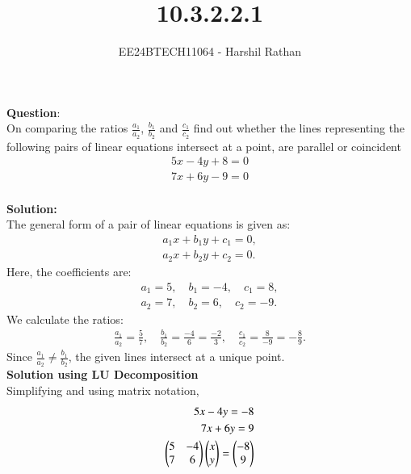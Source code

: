 \documentclass[journal]{IEEEtran}
\begin{document}

\vspace{3cm}

\title{10.3.2.2.1}
\author{EE24BTECH11064 - Harshil Rathan}
 \maketitle
{\let\newpage\relax\maketitle}

\renewcommand{\thefigure}{\theenumi}
\renewcommand{\thetable}{\theenumi}
\setlength{\intextsep}{10pt} %


\renewcommand{\thetable}{\theenumi}
\textbf{Question}:\\
On comparing the ratios $\frac{a_1}{a_2}$, $\frac{b_1}{b_2}$ and $\frac{c_1}{c_2}$ find out whether the lines representing the following pairs of linear equations intersect at a point, are parallel or coincident
\begin{align*}
    5x-4y+8 = 0 \\ 7x+6y-9 = 0 
\end{align*}
\\
\textbf{Solution: }\\
The general form of a pair of linear equations is given as:
\begin{align*}
    a_1x + b_1y + c_1 = 0, \\
    a_2x + b_2y + c_2 = 0.
\end{align*}
Here, the coefficients are:
\begin{align*}
    a_1 = 5, \quad b_1 = -4, \quad c_1 = 8, \\
    a_2 = 7, \quad b_2 = 6, \quad c_2 = -9.
\end{align*}
We calculate the ratios:
\begin{align*}
    \frac{a_1}{a_2} = \frac{5}{7}, \quad \frac{b_1}{b_2} = \frac{-4}{6} = \frac{-2}{3}, \quad \frac{c_1}{c_2} = \frac{8}{-9} = -\frac{8}{9}.
\end{align*}
Since $\frac{a_1}{a_2} \neq \frac{b_1}{b_2}$, the given lines intersect at a unique point.\\
\textbf{Solution using LU Decomposition}\\
Simplifying and using matrix notation,
\begin{align}
    5x-4y = -8\\
    7x+6y = 9 \\
    \begin{pmatrix}
        5 & -4\\
        7 & 6
    \end{pmatrix} \begin{pmatrix}x \\ y\end{pmatrix}= \begin{pmatrix} -8 \\ 9\end{pmatrix}
\end{align}
\end{document}
